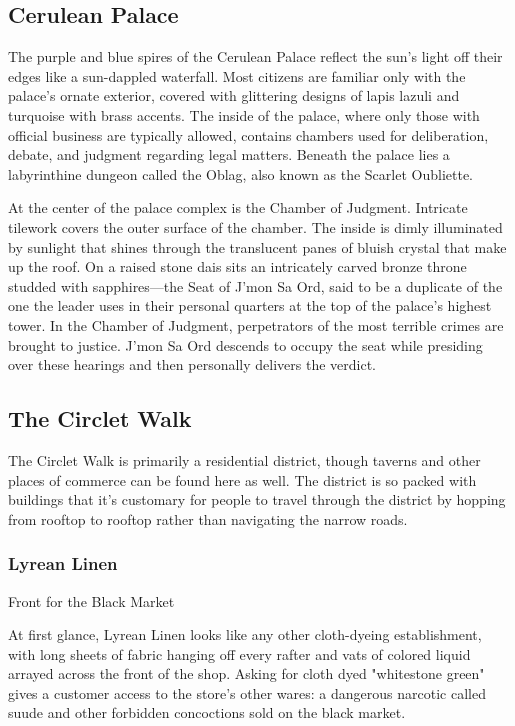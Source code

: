\documentclass[10pt,a4paper,twoside,bg=print,twocolumn,openany,nodeprecatedcode]{dndbook}
\begin{document}
\subsection{Cerulean Palace}
The purple and blue spires of the Cerulean Palace reflect the sun's light off their edges like a sun-dappled waterfall. Most citizens are familiar only with the palace's ornate exterior, covered with glittering designs of lapis lazuli and turquoise with brass accents. The inside of the palace, where only those with official business are typically allowed, contains chambers used for deliberation, debate, and judgment regarding legal matters. Beneath the palace lies a labyrinthine dungeon called the Oblag, also known as the Scarlet Oubliette.

At the center of the palace complex is the Chamber of Judgment. Intricate tilework covers the outer surface of the chamber. The inside is dimly illuminated by sunlight that shines through the translucent panes of bluish crystal that make up the roof. On a raised stone dais sits an intricately carved bronze throne studded with sapphires—the Seat of J'mon Sa Ord, said to be a duplicate of the one the leader uses in their personal quarters at the top of the palace's highest tower. In the Chamber of Judgment, perpetrators of the most terrible crimes are brought to justice. J'mon Sa Ord descends to occupy the seat while presiding over these hearings and then personally delivers the verdict.

\subsection{The Circlet Walk}
The Circlet Walk is primarily a residential district, though taverns and other places of commerce can be found here as well. The district is so packed with buildings that it's customary for people to travel through the district by hopping from rooftop to rooftop rather than navigating the narrow roads.

\subsubsection{Lyrean Linen}
Front for the Black Market

At first glance, Lyrean Linen looks like any other cloth-dyeing establishment, with long sheets of fabric hanging off every rafter and vats of colored liquid arrayed across the front of the shop. Asking for cloth dyed "whitestone green" gives a customer access to the store's other wares: a dangerous narcotic called suude and other forbidden concoctions sold on the black market.
\end{document}
